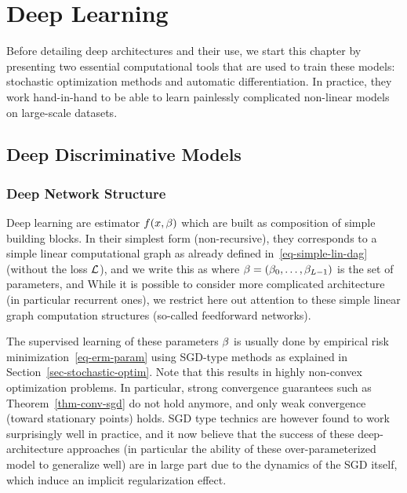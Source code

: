 
\chapter{Deep Learning}
\label{c-deep-learning}



Before detailing deep architectures and their use, we start this chapter by presenting two essential computational tools that are used to train these models: stochastic optimization methods and automatic differentiation. In practice, they work hand-in-hand to be able to learn painlessly complicated non-linear models on large-scale datasets. 




\section{Deep Discriminative Models}
\label{sec-deepnet-discr}

\subsection{Deep Network Structure}
\label{sec-deep-structure}

Deep learning are estimator $f(x,\beta)$ which are built as composition of simple building blocks.
%
In their simplest form (non-recursive), they corresponds to a simple linear computational graph as already defined in~\eqref{eq-simple-lin-dag} (without the loss $\mathcal{L}$), and we write this as
where $\beta=(\beta_0,\ldots,\beta_{L-1})$ is the set of parameters, and 
%
While it is possible to consider more complicated architecture (in particular recurrent ones), we restrict here out attention to these simple linear graph computation structures (so-called feedforward networks).

The supervised learning of these parameters $\beta$ is usually done by empirical risk minimization~\eqref{eq-erm-param} using SGD-type methods as explained in Section~\ref{sec-stochastic-optim}. Note that this results in highly non-convex optimization problems. In particular, strong convergence guarantees such as Theorem~\ref{thm-conv-sgd} do not hold anymore, and only weak convergence (toward stationary points) holds. SGD type technics are however found to work surprisingly well in practice, and it now believe that the success of these deep-architecture approaches (in particular the ability of these over-parameterized model to generalize well) are in large part due to the dynamics of the SGD itself, which induce an implicit regularization effect. 

